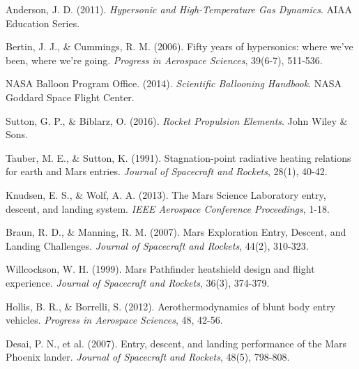 \documentclass[11pt,a4paper]{article}
\begin{document}
\begin{thebibliography}{99}

Anderson, J. D. (2011). \textit{Hypersonic and High-Temperature Gas Dynamics}. AIAA Education Series.

Bertin, J. J., \& Cummings, R. M. (2006). Fifty years of hypersonics: where we've been, where we're going. \textit{Progress in Aerospace Sciences}, 39(6-7), 511-536.

NASA Balloon Program Office. (2014). \textit{Scientific Ballooning Handbook}. NASA Goddard Space Flight Center.

Sutton, G. P., \& Biblarz, O. (2016). \textit{Rocket Propulsion Elements}. John Wiley \& Sons.

Tauber, M. E., \& Sutton, K. (1991). Stagnation-point radiative heating relations for earth and Mars entries. \textit{Journal of Spacecraft and Rockets}, 28(1), 40-42.

Knudsen, E. S., \& Wolf, A. A. (2013). The Mars Science Laboratory entry, descent, and landing system. \textit{IEEE Aerospace Conference Proceedings}, 1-18.

Braun, R. D., \& Manning, R. M. (2007). Mars Exploration Entry, Descent, and Landing Challenges. \textit{Journal of Spacecraft and Rockets}, 44(2), 310-323.

Willcockson, W. H. (1999). Mars Pathfinder heatshield design and flight experience. \textit{Journal of Spacecraft and Rockets}, 36(3), 374-379.

Hollis, B. R., \& Borrelli, S. (2012). Aerothermodynamics of blunt body entry vehicles. \textit{Progress in Aerospace Sciences}, 48, 42-56.

Desai, P. N., et al. (2007). Entry, descent, and landing performance of the Mars Phoenix lander. \textit{Journal of Spacecraft and Rockets}, 48(5), 798-808.

\end{thebibliography}
\end{document}
